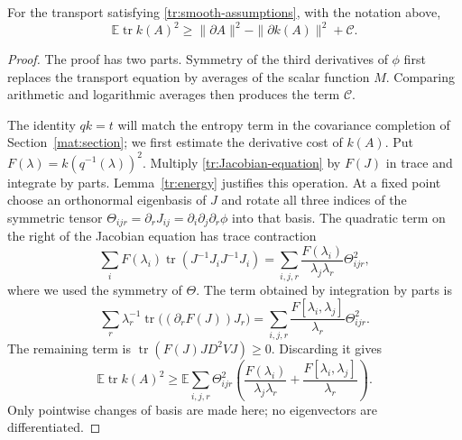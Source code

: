 \begin{proposition}\label{tr:surplus}
For the transport satisfying \eqref{tr:smooth-assumptions}, with the
notation above,
\begin{equation}\label{tr:surplus-inequality}
 \mathbb E\operatorname{tr}k(A)^2
 \ge\|\partial A\|^2-\|\partial k(A)\|^2+\mathcal C.
\end{equation}
\end{proposition}
\begin{proof}
The proof has two parts.  Symmetry of the third derivatives of $\phi$
first replaces the transport equation by averages of the scalar
function $M$.  Comparing arithmetic and logarithmic averages then
produces the term $\mathcal C$.

The identity $qk=t$ will match the entropy term in the covariance
completion of Section~\ref{mat:section}; we first estimate the derivative
cost of $k(A)$. Put $F(\lambda)=k(q^{-1}(\lambda))^2$. Multiply
\eqref{tr:Jacobian-equation} by $F(J)$ in trace and integrate by parts.
Lemma~\ref{tr:energy} justifies this operation.  At a fixed point
choose an orthonormal eigenbasis of $J$ and rotate all three indices
of the symmetric tensor
$\Theta_{ijr}=\partial_rJ_{ij}=\partial_i\partial_j\partial_r\phi$
into that basis.  The quadratic term on the right of the Jacobian
equation has trace contraction
\[
 \sum_i F(\lambda_i)\operatorname{tr}(J^{-1}J_iJ^{-1}J_i)
 =\sum_{i,j,r}\frac{F(\lambda_i)}{\lambda_j\lambda_r}\Theta_{ijr}^2,
\]
where we used the symmetry of $\Theta$.  The term obtained by integration
by parts is
\[
 \sum_r\lambda_r^{-1}\operatorname{tr}\bigl((\partial_rF(J))J_r\bigr)
 =\sum_{i,j,r}\frac{F[\lambda_i,\lambda_j]}{\lambda_r}\Theta_{ijr}^2.
\]
The remaining term is
$\operatorname{tr}(F(J)JD^2VJ)\ge0$.
Discarding it gives
\begin{equation}\label{tr:initial-multiplier}
 \mathbb E\operatorname{tr}k(A)^2
 \ge\mathbb E\sum_{i,j,r}\Theta_{ijr}^2
 \left(\frac{F(\lambda_i)}{\lambda_j\lambda_r}
             +\frac{F[\lambda_i,\lambda_j]}{\lambda_r}\right).
\end{equation}
Only pointwise changes of basis are made here; no eigenvectors are
differentiated.


\end{proof}
